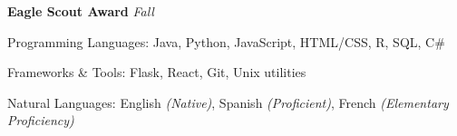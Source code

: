 \documentclass[10pt,letterpaper]{article}
\begin{document}
\headedsection
  {\textbf{Eagle Scout Award}}
  {\emph{Fall }}
  {}

\spacedhrule{0.5em}{-0.4em}


\inlineheadsection
  {Programming Languages:}
  {Java, Python, JavaScript, HTML/CSS, R, SQL, C\#}

\inlineheadsection
  {Frameworks \& Tools:}
  {Flask, React, Git, Unix utilities}

\inlineheadsection
  {Natural Languages:}
  {English \emph{(Native)}, Spanish \emph{(Proficient)}, French \emph{(Elementary Proficiency)}}
\end{document}
